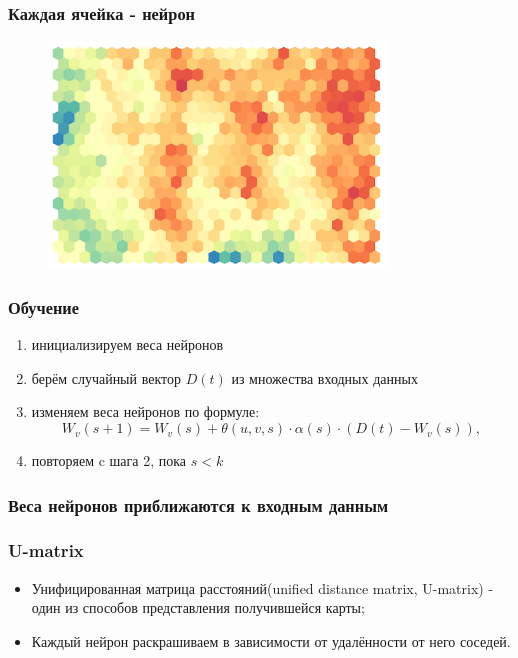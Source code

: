 \documentclass[aspectratio=169]{beamer}
\begin{document}
\begin{frame}
  \frametitle{Каждая ячейка - нейрон}
  \begin{figure}
    \centering
    \includegraphics[width=0.8\textwidth]{every-cell-neuron.png}
  \end{figure}
\end{frame}

\begin{frame}
  \frametitle{Обучение}
  \begin{enumerate}
    \item инициализируем веса нейронов
    \item берём случайный вектор $D(t)$ из множества входных данных
    \item изменяем веса нейронов по формуле:
    \[
      W_v(s + 1)=W_v(s)+\theta(u, v, s) \cdot \alpha(s) \cdot (D(t) - W_v(s)),
    \]
    \item повторяем c шага 2, пока $s < k$
  \end{enumerate}

\end{frame}

\begin{frame}
  \frametitle{Веса нейронов приближаются к входным данным}
  \begin{figure}
    \centering
    \def\svgwidth{\columnwidth}
    
  \end{figure}
\end{frame}

\begin{frame}
  \frametitle{U-matrix}
  \begin{itemize}
    \item Унифицированная матрица расстояний(unified distance matrix, U-matrix)
    - один из способов представления получившейся карты;
    \item Каждый нейрон раскрашиваем в зависимости от удалённости от него
    соседей.
  \end{itemize}
\end{frame}
\end{document}
